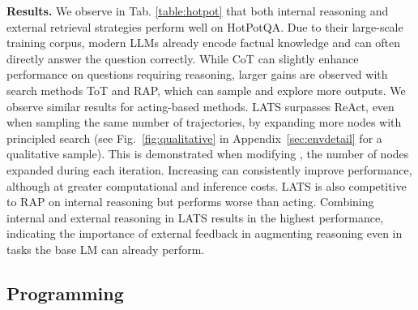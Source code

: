 \documentclass{article} \usepackage{iclr2024_conference,times}
\begin{document}
 
\textbf{Results.} We observe in Tab. \ref{table:hotpot} that both internal reasoning and external retrieval strategies perform well on HotPotQA. Due to their large-scale training corpus, modern LLMs already encode factual knowledge and can often directly answer the question correctly. While CoT can slightly enhance performance on questions requiring reasoning, larger gains are observed with search methods ToT and RAP, which can sample and explore more outputs. We observe similar results for acting-based methods. LATS surpasses ReAct, even when sampling the same number of trajectories, by expanding more nodes with principled search (see Fig.~\ref{fig:qualitative} in Appendix~\ref{sec:envdetail} for a qualitative sample). This is demonstrated when modifying , the number of nodes expanded during each iteration. Increasing  can consistently improve performance, although at greater computational and inference costs. LATS is also competitive to RAP on internal reasoning but performs worse than acting. Combining internal and external reasoning in LATS results in the highest performance, indicating the importance of external feedback in augmenting reasoning even in tasks the base LM can already perform.

\subsection{Programming}
\end{document}
